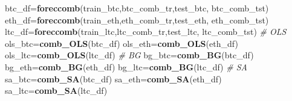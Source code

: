 \documentclass[
]{article}
\newenvironment{Shaded}{\begin{snugshade}}{\end{snugshade}}
\newcommand{\CommentTok}[1]{\textcolor[rgb]{0.56,0.35,0.01}{\textit{#1}}}
\newcommand{\FunctionTok}[1]{\textcolor[rgb]{0.13,0.29,0.53}{\textbf{#1}}}
\newcommand{\NormalTok}[1]{#1}
\newcommand{\OtherTok}[1]{\textcolor[rgb]{0.56,0.35,0.01}{#1}}
\begin{document}
\begin{Shaded}
\begin{Highlighting}[]
\NormalTok{btc\_df}\OtherTok{=}\FunctionTok{foreccomb}\NormalTok{(train\_btc,btc\_comb\_tr,test\_btc, btc\_comb\_tst)}
\NormalTok{eth\_df}\OtherTok{=}\FunctionTok{foreccomb}\NormalTok{(train\_eth,eth\_comb\_tr,test\_eth, eth\_comb\_tst)}
\NormalTok{ltc\_df}\OtherTok{=}\FunctionTok{foreccomb}\NormalTok{(train\_ltc,ltc\_comb\_tr,test\_ltc, ltc\_comb\_tst)}
\CommentTok{\# OLS}
\NormalTok{ols\_btc}\OtherTok{=}\FunctionTok{comb\_OLS}\NormalTok{(btc\_df)}
\NormalTok{ols\_eth}\OtherTok{=}\FunctionTok{comb\_OLS}\NormalTok{(eth\_df)}
\NormalTok{ols\_ltc}\OtherTok{=}\FunctionTok{comb\_OLS}\NormalTok{(ltc\_df)}
\CommentTok{\# BG}
\NormalTok{bg\_btc}\OtherTok{=}\FunctionTok{comb\_BG}\NormalTok{(btc\_df)}
\NormalTok{bg\_eth}\OtherTok{=}\FunctionTok{comb\_BG}\NormalTok{(eth\_df)}
\NormalTok{bg\_ltc}\OtherTok{=}\FunctionTok{comb\_BG}\NormalTok{(ltc\_df)}
\CommentTok{\# SA}
\NormalTok{sa\_btc}\OtherTok{=}\FunctionTok{comb\_SA}\NormalTok{(btc\_df)}
\NormalTok{sa\_eth}\OtherTok{=}\FunctionTok{comb\_SA}\NormalTok{(eth\_df)}
\NormalTok{sa\_ltc}\OtherTok{=}\FunctionTok{comb\_SA}\NormalTok{(ltc\_df)}


\end{Highlighting}
\end{Shaded}
\end{document}
